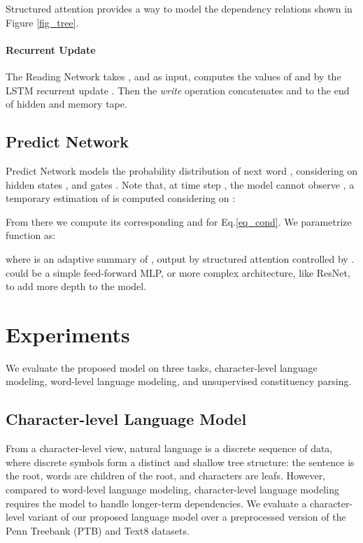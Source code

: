 \documentclass{article} \usepackage{iclr2018_conference,times}
\begin{document}
Structured attention provides a way to model the dependency relations shown in Figure \ref{fig_tree}.

\paragraph{Recurrent Update} The Reading Network takes ,  and  as input, computes the values of  and  by the LSTM recurrent update \citep{hochreiter1997long}.
Then the \textit{write} operation concatenates  and  to the end of hidden and memory tape.

\subsection{Predict Network}


Predict Network models the probability distribution of next word , considering on hidden states , and gates . Note that, at time step , the model cannot observe  , a temporary estimation of  is computed considering on :

From there we compute its corresponding  and  for Eq.\ref{eq_cond}.
We parametrize  function as:

where  is an adaptive summary of , output by structured attention controlled by .  could be a simple feed-forward MLP, or more complex architecture, like ResNet, to add more depth to the model. 







\section{Experiments}
We evaluate the proposed model on three tasks, character-level language modeling, word-level language modeling, and unsupervised constituency parsing. 


\subsection{Character-level Language Model}
From a character-level view, natural language is a discrete sequence of data, where discrete symbols form a distinct and shallow tree structure: the sentence is the root, words are children of the root, and characters are leafs. However, compared to word-level language modeling, character-level language modeling requires the model to handle longer-term dependencies. We evaluate a character-level variant of our proposed language model over a preprocessed version of the Penn Treebank (PTB) and Text8 datasets.
\end{document}
